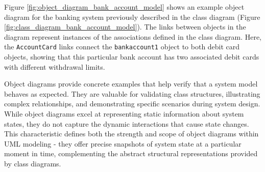 Figure \ref{fig:object_diagram_bank_account_model} shows an example object diagram for the banking system previously described in the class diagram (Figure \ref{fig:class_diagram_bank_account_model}).
The links between objects in the diagram represent instances of the associations defined in the class diagram. Here, the \texttt{AccountCard} links connect the \texttt{bankaccount1} object to both debit card objects, showing that this particular bank account has two associated debit cards with different withdrawal limits.

Object diagrams provide concrete examples that help verify that a system model behaves as expected. They are valuable for validating class structures, illustrating complex relationships, and demonstrating specific scenarios during system design. While object diagrams excel at representing static information about system states, they do not capture the dynamic interactions that cause state changes. This characteristic defines both the strength and scope of object diagrams within UML modeling - they offer precise snapshots of system state at a particular moment in time, complementing the abstract structural representations provided by class diagrams.





